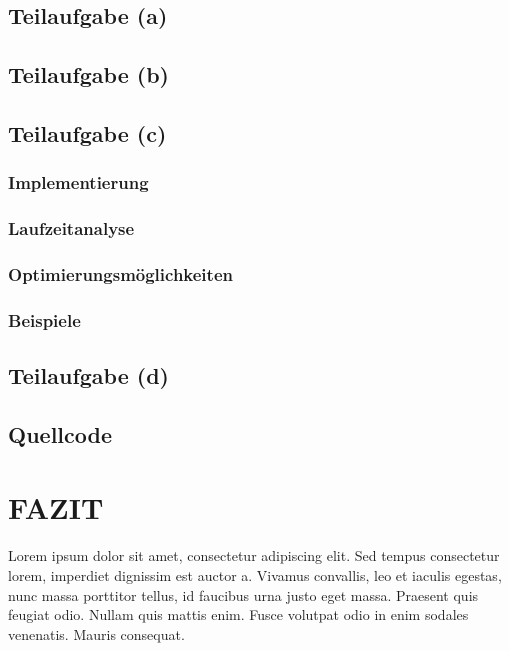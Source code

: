 \documentclass[a4paper,12pt]{article}
\begin{document}
\subsection{Teilaufgabe (a)}

\subsection{Teilaufgabe (b)}

\subsection{Teilaufgabe (c)}
\subsubsection{Implementierung}
\subsubsection{Laufzeitanalyse}
\subsubsection{Optimierungsmöglichkeiten}
\subsubsection{Beispiele}

\subsection{Teilaufgabe (d)}

\subsection{Quellcode}


\newpage
\section{FAZIT}



Lorem ipsum dolor sit amet, consectetur adipiscing elit. Sed tempus consectetur lorem, imperdiet dignissim est auctor a. Vivamus convallis, leo et iaculis egestas, nunc massa porttitor tellus, id faucibus urna justo eget massa. Praesent quis feugiat odio. Nullam quis mattis enim. Fusce volutpat odio in enim sodales venenatis. Mauris consequat.
\end{document}
